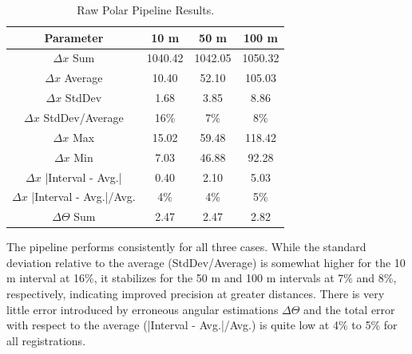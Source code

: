 \begin{table}[H]
    \centering
    \begin{tabular}{|c|c|c|c|}
        \hline
        \textbf{Parameter} & \textbf{10 m} & \textbf{50 m} & \textbf{100 m} \\ \hline
        \(\Delta x\) Sum & 1040.42 & 1042.05 & 1050.32 \\ \hline
        \(\Delta x\) Average & 10.40 & 52.10 & 105.03 \\ \hline
        \(\Delta x\) StdDev & 1.68 & 3.85 & 8.86 \\ \hline
        \(\Delta x\) StdDev/Average & 16\% & 7\% & 8\% \\ \hline
        \(\Delta x\) Max & 15.02 & 59.48 & 118.42 \\ \hline
        \(\Delta x\) Min & 7.03 & 46.88 & 92.28 \\ \hline
        \(\Delta x\) |Interval - Avg.| & 0.40 & 2.10 & 5.03 \\ \hline
        \(\Delta x\) |Interval - Avg.|/Avg. & 4\% & 4\% & 5\% \\ \hline
        \(\Delta\Theta\) Sum & 2.47 & 2.47 & 2.82 \\ \hline
    \end{tabular}
    \caption{Raw Polar Pipeline Results.}
\end{table}

The pipeline performs consistently for all three cases. While the standard deviation relative to the average (StdDev/Average) is somewhat higher for the 10 m interval at 16\%, it stabilizes for the 50 m and 100 m intervals at 7\% and 8\%, respectively, indicating improved precision at greater distances. There is very little error introduced by erroneous angular estimations \(\Delta\Theta\) and the total error with respect to the average (|Interval - Avg.|/Avg.) is quite low at 4\% to 5\% for all registrations.  


